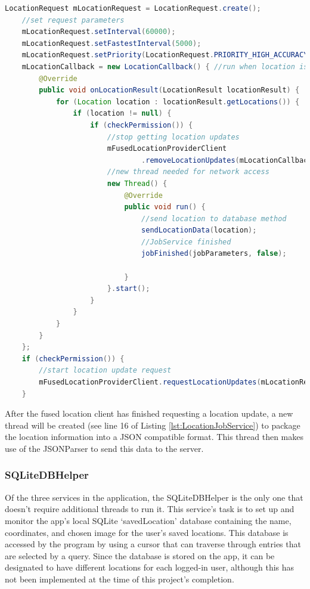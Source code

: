 \begin{lstlisting}[caption={Extract from the LocationJobService's getLastLocation(...) method.},label={lst:LocationJobService},language=Java]
    LocationRequest mLocationRequest = LocationRequest.create();
    //set request parameters
    mLocationRequest.setInterval(60000);
    mLocationRequest.setFastestInterval(5000);
    mLocationRequest.setPriority(LocationRequest.PRIORITY_HIGH_ACCURACY);
    mLocationCallback = new LocationCallback() { //run when location is found
        @Override
        public void onLocationResult(LocationResult locationResult) {
            for (Location location : locationResult.getLocations()) {
                if (location != null) {
                    if (checkPermission()) {
                        //stop getting location updates
                        mFusedLocationProviderClient
                                .removeLocationUpdates(mLocationCallback);
                        //new thread needed for network access
                        new Thread() {
                            @Override
                            public void run() {
                                //send location to database method
                                sendLocationData(location);
                                //JobService finished 
                                jobFinished(jobParameters, false);

                            }
                        }.start();
                    }
                }
            }
        }
    };
    if (checkPermission()) {
        //start location update request
        mFusedLocationProviderClient.requestLocationUpdates(mLocationRequest, mLocationCallback, null);
    }
\end{lstlisting}

After the fused location client has finished requesting a location update, a new thread will be created (see line 16 of Listing \ref{lst:LocationJobService}) to package the location information into a JSON compatible format. This thread then makes use of the JSONParser to send this data to the server.

\subsubsection{SQLiteDBHelper}
Of the three services in the application, the SQLiteDBHelper is the only one that doesn't require additional threads to run it. This service's task is to set up and monitor the app's local SQLite `savedLocation' database containing the name, coordinates, and chosen image for the user's saved locations. This database is accessed by the program by using a cursor that can traverse through entries that are selected by a query. Since the database is stored on the app, it can be designated to have different locations for each logged-in user, although this has not been implemented at the time of this project's completion.

